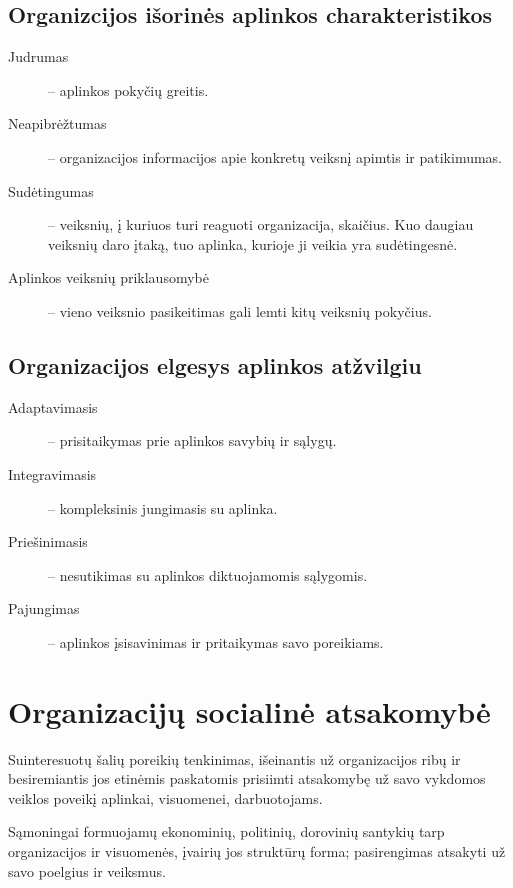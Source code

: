 \section{Organizcijos išorinės aplinkos charakteristikos}

\begin{description}
  \item[Judrumas] – aplinkos pokyčių greitis.
  \item[Neapibrėžtumas] – organizacijos informacijos apie konkretų
    veiksnį apimtis ir patikimumas.
  \item[Sudėtingumas] – veiksnių, į kuriuos turi reaguoti organizacija,
    skaičius. Kuo daugiau veiksnių daro įtaką, tuo aplinka, kurioje
    ji veikia yra sudėtingesnė.
  \item[Aplinkos veiksnių priklausomybė] – vieno veiksnio pasikeitimas
    gali lemti kitų veiksnių pokyčius.
\end{description}

\section{Organizacijos elgesys aplinkos atžvilgiu}

\begin{description}
  \item[Adaptavimasis] – prisitaikymas prie aplinkos savybių ir sąlygų.
  \item[Integravimasis] – kompleksinis jungimasis su aplinka.
  \item[Priešinimasis] – nesutikimas su aplinkos diktuojamomis sąlygomis.
  \item[Pajungimas] – aplinkos įsisavinimas ir pritaikymas savo poreikiams.
\end{description}

\chapter{Organizacijų socialinė atsakomybė}

\begin{defn}
  Suinteresuotų šalių poreikių tenkinimas, išeinantis už organizacijos
  ribų ir besiremiantis jos etinėmis paskatomis prisiimti atsakomybę
  už savo vykdomos veiklos poveikį aplinkai, visuomenei, darbuotojams.
\end{defn}

\begin{defn}
  Sąmoningai formuojamų ekonominių, politinių, dorovinių santykių
  tarp organizacijos ir visuomenės, įvairių jos struktūrų forma;
  pasirengimas atsakyti už savo poelgius ir veiksmus.
\end{defn}

